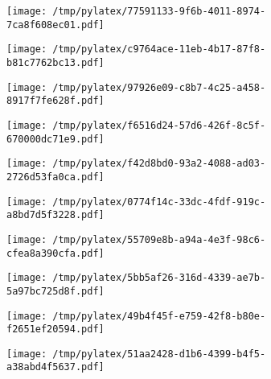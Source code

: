 \documentclass{article}
\begin{document}
\begin{figure}[htbp]
\begin{subfigure}[b]{.3\linewidth}
\texttt{[image: /tmp/pylatex/77591133-9f6b-4011-8974-7ca8f608ec01.pdf]}
\end{subfigure}
\begin{subfigure}[b]{.3\linewidth}
\texttt{[image: /tmp/pylatex/c9764ace-11eb-4b17-87f8-b81c7762bc13.pdf]}
\end{subfigure}
\begin{subfigure}[b]{.3\linewidth}
\texttt{[image: /tmp/pylatex/97926e09-c8b7-4c25-a458-8917f7fe628f.pdf]}
\end{subfigure}
\begin{subfigure}[b]{.3\linewidth}
\texttt{[image: /tmp/pylatex/f6516d24-57d6-426f-8c5f-670000dc71e9.pdf]}
\end{subfigure}
\begin{subfigure}[b]{.3\linewidth}
\texttt{[image: /tmp/pylatex/f42d8bd0-93a2-4088-ad03-2726d53fa0ca.pdf]}
\end{subfigure}
\begin{subfigure}[b]{.3\linewidth}
\texttt{[image: /tmp/pylatex/0774f14c-33dc-4fdf-919c-a8bd7d5f3228.pdf]}
\end{subfigure}
\begin{subfigure}[b]{.3\linewidth}
\texttt{[image: /tmp/pylatex/55709e8b-a94a-4e3f-98c6-cfea8a390cfa.pdf]}
\end{subfigure}
\begin{subfigure}[b]{.3\linewidth}
\texttt{[image: /tmp/pylatex/5bb5af26-316d-4339-ae7b-5a97bc725d8f.pdf]}
\end{subfigure}
\begin{subfigure}[b]{.3\linewidth}
\texttt{[image: /tmp/pylatex/49b4f45f-e759-42f8-b80e-f2651ef20594.pdf]}
\end{subfigure}
\begin{subfigure}[b]{.3\linewidth}
\texttt{[image: /tmp/pylatex/51aa2428-d1b6-4399-b4f5-a38abd4f5637.pdf]}
\end{subfigure}
\end{figure}
\end{document}
